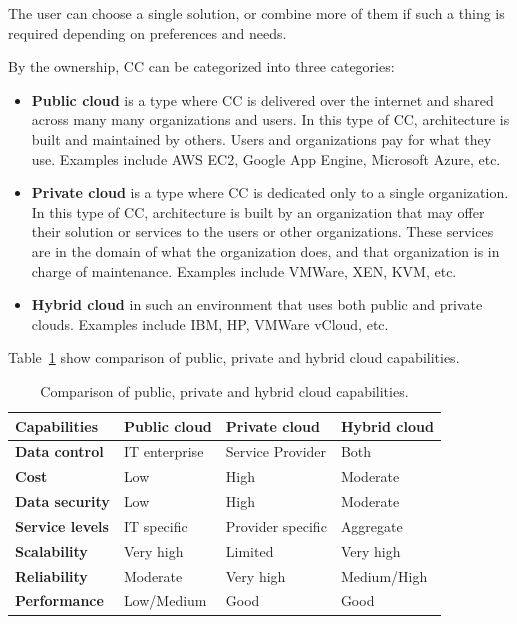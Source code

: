 \noindent
The user can choose a single solution, or combine more of them if such a thing is required depending on preferences and needs.

By the ownership, CC can be categorized into three categories:

\begin{itemize}
	\item \textbf{Public cloud} is a type where CC is delivered over the internet and shared across many many organizations and users. In this type of CC, architecture is built and maintained by others. Users and organizations pay for what they use. Examples include AWS EC2, Google App Engine, Microsoft Azure, etc.
	\item \textbf{Private cloud} is a type where CC is dedicated only to a single organization. In this type of CC, architecture is built by an organization that may offer their solution or services to the users or other organizations. These services are in the domain of what the organization does, and that organization is in charge of maintenance. Examples include VMWare, XEN, KVM, etc.
	\item \textbf{Hybrid cloud} in such an environment that uses both public and private clouds. Examples include IBM, HP, VMWare vCloud, etc.
\end{itemize}

Table~\ref{tab:table4} show comparison of public, private and hybrid cloud capabilities.\label{sec_types}

\begin{table}[h!]
	\begin{center}
		\begin{tabular}{l|l|l|l}
			\textbf{Capabilities} & \textbf{Public cloud} & \textbf{Private cloud} & \textbf{Hybrid cloud}\\
			\hline
			\textbf{Data control} & IT enterprise & Service Provider & Both \\
			\textbf{Cost} & Low & High & Moderate \\
			\textbf{Data security} & Low & High & Moderate \\
			\textbf{Service levels} & IT specific & Provider specific & Aggregate \\
			\textbf{Scalability} & Very high & Limited & Very high \\	
			\textbf{Reliability} & Moderate & Very high & Medium/High\\	
			\textbf{Performance} & Low/Medium & Good & Good \\
\end{tabular}
	\end{center}
	\vspace{-0.5cm}
	\caption{Comparison of public, private and hybrid cloud capabilities.}
	\label{tab:table4}
\end{table}

